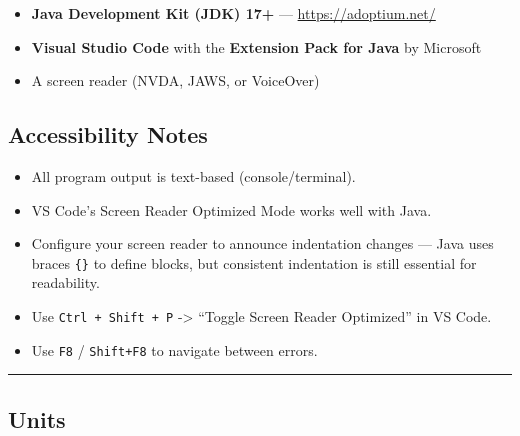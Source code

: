 \documentclass[
  justified,
  openright,
]{tufte-book}
\providecommand{\tightlist}{%
  \setlength{\itemsep}{0pt}\setlength{\parskip}{0pt}}
\begin{document}
\begin{itemize}
\tightlist
\item
  \textbf{Java Development Kit (JDK) 17+} ---
  \url{https://adoptium.net/}
\item
  \textbf{Visual Studio Code} with the \textbf{Extension Pack for Java}
  by Microsoft
\item
  A screen reader (NVDA, JAWS, or VoiceOver)
\end{itemize}

\subsection{Accessibility Notes}\label{accessibility-notes}

\begin{itemize}
\tightlist
\item
  All program output is text-based (console/terminal).
\item
  VS Code's Screen Reader Optimized Mode works well with Java.
\item
  Configure your screen reader to announce indentation changes --- Java
  uses braces \texttt{\{\}} to define blocks, but consistent indentation
  is still essential for readability.
\item
  Use \texttt{Ctrl\ +\ Shift\ +\ P} -\textgreater{} ``Toggle Screen
  Reader Optimized'' in VS Code.
\item
  Use \texttt{F8} / \texttt{Shift+F8} to navigate between errors.
\end{itemize}

\begin{center}\rule{0.5\linewidth}{0.5pt}\end{center}

\subsection{Units}\label{units}
\end{document}
